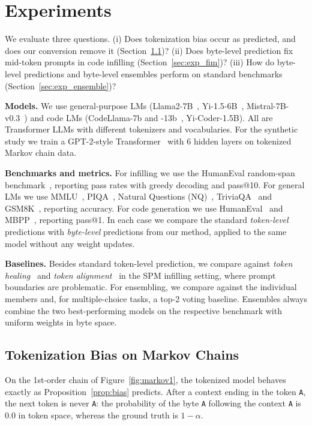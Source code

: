 \documentclass{article} %
\newcommand{\tok}[1]{\texttt{#1}}
\begin{document}
\section{Experiments}
\label{sec:experiments}
We evaluate three questions. (i) Does tokenization bias occur as predicted, and does our conversion remove it (Section~\ref{sec:exp_synthetic})? (ii) Does byte-level prediction fix mid-token prompts in code infilling (Section~\ref{sec:exp_fim})? (iii) How do byte-level predictions and byte-level ensembles perform on standard benchmarks (Section~\ref{sec:exp_ensemble})?

\textbf{Models.} We use general-purpose LMs (Llama2-7B~\citep{touvron2023llama}, Yi-1.5-6B~\citep{young2024yi}, Mistral-7B-v0.3~\citep{jiang2023mistral}) and code LMs (CodeLlama-7b and -13b~\citep{roziere2023code}, Yi-Coder-1.5B). All are Transformer LLMs with different tokenizers and vocabularies. For the synthetic study we train a GPT-2-style Transformer~\citep{radford2019language} with 6 hidden layers on tokenized Markov chain data.

\textbf{Benchmarks and metrics.} For infilling we use the HumanEval random-span benchmark~\citep{bavarian2022efficient}, reporting pass rates with greedy decoding and pass@10. For general LMs we use MMLU~\citep{hendrycks2021measuring}, PIQA~\citep{bisk2020piqa}, Natural Questions (NQ)~\citep{kwiatkowski2019natural}, TriviaQA~\citep{joshi2017triviaqa} and GSM8K~\citep{cobbe2021training}, reporting accuracy. For code generation we use HumanEval~\citep{chen2021evaluating} and MBPP~\citep{austin2021program}, reporting pass@1. In each case we compare the standard \emph{token-level} predictions with \emph{byte-level} predictions from our method, applied to the same model without any weight updates.

\textbf{Baselines.} Besides standard token-level prediction, we compare against \emph{token healing}~\citep{dagan2024getting} and \emph{token alignment}~\citep{athiwaratkun2024token} in the SPM infilling setting, where prompt boundaries are problematic. For ensembling, we compare against the individual members and, for multiple-choice tasks, a top-2 voting baseline. Ensembles always combine the two best-performing models on the respective benchmark with uniform weights in byte space.

\subsection{Tokenization Bias on Markov Chains}
\label{sec:exp_synthetic}
On the 1st-order chain of Figure~\ref{fig:markov1}, the tokenized model behaves exactly as Proposition~\ref{prop:bias} predicts. After a context ending in the token \tok{A}, the next token is never \tok{A}: the probability of the byte \tok{A} following the context \tok{A} is $0.0$ in token space, whereas the ground truth is $1-\alpha$.
\end{document}
